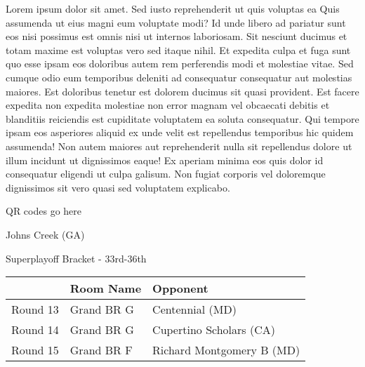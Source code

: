 \documentclass{article}%
\begin{document}
\vspace*{8pt}%
\linebreak%
\newline%
\newline%
Lorem ipsum dolor sit amet. Sed iusto reprehenderit ut quis voluptas ea Quis assumenda ut eius magni eum voluptate modi? Id unde libero ad pariatur sunt eos nisi possimus est omnis nisi ut internos laboriosam. Sit nesciunt ducimus et totam maxime est voluptas vero sed itaque nihil. Et expedita culpa et fuga sunt quo esse ipsam eos doloribus autem rem perferendis modi et molestiae vitae.\newline%
\newline%
Sed cumque odio eum temporibus deleniti ad consequatur consequatur aut molestias maiores. Est doloribus tenetur est dolorem ducimus sit quasi provident. Est facere expedita non expedita molestiae non error magnam vel obcaecati debitis et blanditiis reiciendis est cupiditate voluptatem ea soluta consequatur. Qui tempore ipsam eos asperiores aliquid ex unde velit est repellendus temporibus hic quidem assumenda!\newline%
\newline%
Non autem maiores aut reprehenderit nulla sit repellendus dolore ut illum incidunt ut dignissimos eaque! Ex aperiam minima eos quis dolor id consequatur eligendi ut culpa galisum. Non fugiat corporis vel doloremque dignissimos sit vero quasi sed voluptatem explicabo.\newline%
\newline%
%
\vspace*{30pt}%
\begin{center}%
\begin{Huge}%
QR codes go here%
\end{Huge}%
\end{center}%
\newpage%
\begin{center}%
\begin{Huge}%
Johns Creek (GA)%
\end{Huge}%
\vspace*{8pt}%
\linebreak%
\begin{Large}%
Superplayoff Bracket {-} 33rd{-}36th%
\end{Large}%
\end{center}%
%
\begin{tabularx}{\textwidth}{|c|Y|Y|}%
\hline%
&Room Name&Opponent\\%
\hline%
Round 13&Grand BR G&Centennial (MD)\\%
Round 14&Grand BR G&Cupertino Scholars (CA)\\%
Round 15&Grand BR F&Richard Montgomery B (MD)\\%
\hline%
\end{tabularx}%
\end{document}
